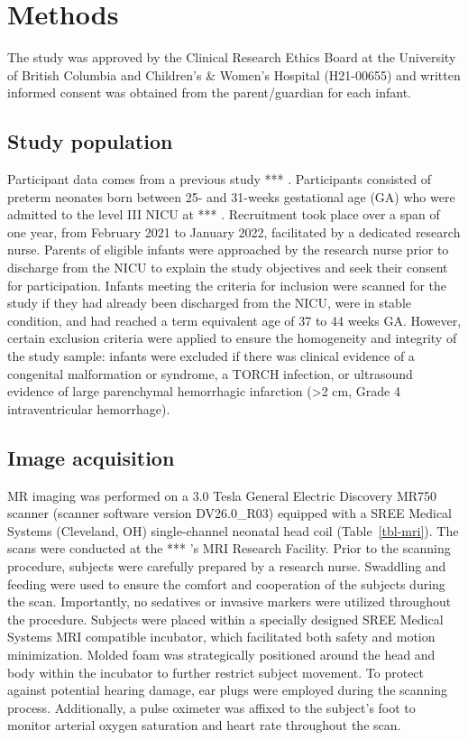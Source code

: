 \documentclass[
true
]{sn-jnl}
\begin{document}
\section{Methods}\label{sec-data-methods}

The study was approved by the Clinical Research Ethics Board at the
University of British Columbia and Children's \& Women's Hospital
(H21-00655) and written informed consent was obtained from the
parent/guardian for each infant.

\subsection{Study population}\label{study-population}

Participant data comes from a previous study *** . Participants
consisted of preterm neonates born between 25- and 31-weeks gestational
age (GA) who were admitted to the level III NICU at *** . Recruitment
took place over a span of one year, from February 2021 to January 2022,
facilitated by a dedicated research nurse. Parents of eligible infants
were approached by the research nurse prior to discharge from the NICU
to explain the study objectives and seek their consent for
participation. Infants meeting the criteria for inclusion were scanned
for the study if they had already been discharged from the NICU, were in
stable condition, and had reached a term equivalent age of 37 to 44
weeks GA. However, certain exclusion criteria were applied to ensure the
homogeneity and integrity of the study sample: infants were excluded if
there was clinical evidence of a congenital malformation or syndrome, a
TORCH infection, or ultrasound evidence of large parenchymal hemorrhagic
infarction (\textgreater2 cm, Grade 4 intraventricular hemorrhage).

\subsection{Image acquisition}\label{image-acquisition}

MR imaging was performed on a 3.0 Tesla General Electric Discovery MR750
scanner (scanner software version DV26.0\_R03) equipped with a SREE
Medical Systems (Cleveland, OH) single-channel neonatal head coil
(Table~\ref{tbl-mri}). The scans were conducted at the *** 's MRI
Research Facility. Prior to the scanning procedure, subjects were
carefully prepared by a research nurse. Swaddling and feeding were used
to ensure the comfort and cooperation of the subjects during the scan.
Importantly, no sedatives or invasive markers were utilized throughout
the procedure. Subjects were placed within a specially designed SREE
Medical Systems MRI compatible incubator, which facilitated both safety
and motion minimization. Molded foam was strategically positioned around
the head and body within the incubator to further restrict subject
movement. To protect against potential hearing damage, ear plugs were
employed during the scanning process. Additionally, a pulse oximeter was
affixed to the subject's foot to monitor arterial oxygen saturation and
heart rate throughout the scan.
\end{document}
